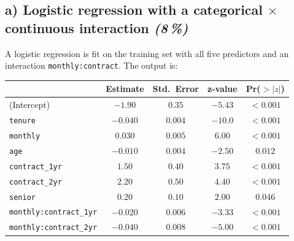 \documentclass[11pt,a4paper]{article}
\newcommand{\subpoints}[1]{\textit{(#1\,\%)}}
\begin{document}
\subsection*{a) Logistic regression with a categorical $\times$ continuous interaction \subpoints{8}}

A logistic regression is fit on the training set with all five predictors and an interaction \texttt{monthly:contract}. The output is:

\begin{center}\small
\begin{tabular}{lcccc}
\toprule
 & \textbf{Estimate} & \textbf{Std.\ Error} & \textbf{z-value} & \textbf{Pr($>|z|$)} \\
\midrule
(Intercept)                       & $-1.90$  & $0.35$  & $-5.43$ & $<0.001$ \\
\texttt{tenure}                   & $-0.040$ & $0.004$ & $-10.0$ & $<0.001$ \\
\texttt{monthly}                  & $0.030$  & $0.005$ & $6.00$  & $<0.001$ \\
\texttt{age}                      & $-0.010$ & $0.004$ & $-2.50$ & $0.012$  \\
\texttt{contract\_1yr}            & $1.50$   & $0.40$  & $3.75$  & $<0.001$ \\
\texttt{contract\_2yr}            & $2.20$   & $0.50$  & $4.40$  & $<0.001$ \\
\texttt{senior}                   & $0.20$   & $0.10$  & $2.00$  & $0.046$  \\
\texttt{monthly:contract\_1yr}    & $-0.020$ & $0.006$ & $-3.33$ & $<0.001$ \\
\texttt{monthly:contract\_2yr}    & $-0.040$ & $0.008$ & $-5.00$ & $<0.001$ \\
\bottomrule
\end{tabular}
\end{center}
\end{document}
